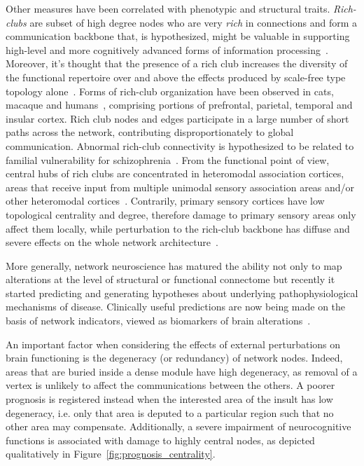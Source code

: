 Other measures have been correlated with phenotypic and structural traits.
\emph{Rich-clubs} are subset of high degree nodes who are very \emph{rich} in connections and form a communication backbone that, is hypothesized, might be valuable in supporting high-level and more cognitively advanced forms of information processing~\cite{collin2014}. Moreover, it's thought that the presence of a rich club increases the diversity of the functional repertoire over and above the effects produced by scale-free type topology alone~\cite{senden2014}.
Forms of rich-club organization have been observed in cats, macaque and humans~\cite{vandenheuvel2011,harriger2012,dereus2013a,collin2014}, comprising portions of prefrontal, parietal, temporal and insular cortex. Rich club nodes and edges participate in a large number of short paths across the network, contributing disproportionately to global communication. 
Abnormal rich-club connectivity is hypothesized to be related to familial vulnerability for schizophrenia~\cite{collin2014impaired}.
From the functional point of view, central hubs of rich clubs are concentrated in heteromodal association cortices, areas that receive input from multiple unimodal sensory association areas and/or other heteromodal cortices~\cite{kandel2013}. Contrarily, primary sensory cortices have low topological centrality and degree, therefore damage to primary sensory areas only affect them locally, while perturbation to the rich-club backbone has diffuse and severe effects on the whole network architecture~\cite{honey2008}.

More generally, network neuroscience has matured the ability not only to map alterations at the level of structural or functional connectome but recently it started predicting and generating hypotheses about underlying pathophysiological mechanisms of disease. Clinically useful predictions are now being made on the basis of network indicators, viewed as biomarkers of brain alterations~\cite{fornito2015}.

An important factor when considering the effects of external perturbations on brain functioning is the degeneracy (or redundancy) of network nodes. Indeed, areas that are buried inside a dense module have high degeneracy, as removal of a vertex is unlikely to affect the communications between the others. A poorer prognosis is registered instead when the interested area of the insult has low degeneracy, i.e. only that area is deputed to a particular region such that no other area may compensate.
Additionally, a severe impairment of neurocognitive functions is associated with damage to highly central nodes, as depicted qualitatively in Figure~\ref{fig:prognosis_centrality}.

